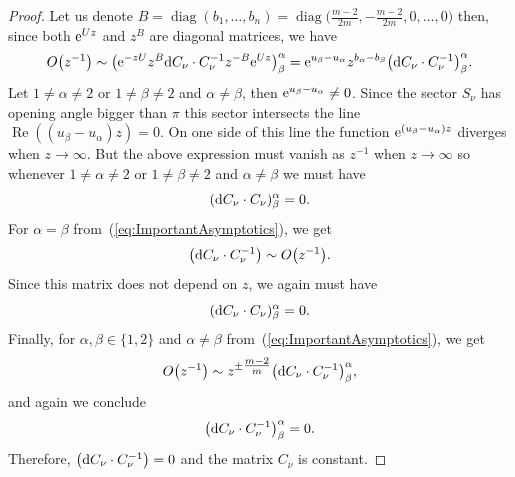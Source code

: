 \documentclass[10pt,a4paper]{amsart}
\numberwithin{equation}{section}
\begin{document}
\begin{proof}
 Let us denote $B=\operatorname{diag}(b_{1},\dots,b_{n})=\operatorname{diag}\bigl(\tfrac{m-2}{2m},-\tfrac{m-2}{2m},0,\dots,0\bigr)$ then, since both ${\rm e}^{Uz}$ and $z^{B}$ are diagonal matrices, we have
 \begin{equation}
 \label{eq:ImportantAsymptotics}
 O\bigl(z^{-1}\bigr)\sim\bigl({\rm e}^{-zU}z^{B}{\rm d} C_{\nu}\cdot C_{\nu}^{-1}z^{-B}{\rm e}^{Uz}\bigr)^{\alpha}_{\beta}={\rm e}^{u_{\beta}-u_{\alpha}}z^{b_{\alpha}-b_{\beta}}\bigl({\rm d}C_{\nu}\cdot C_{\nu}^{-1}\bigr)^{\alpha}_{\beta}.
 \end{equation}
 Let $1\neq\alpha\neq 2$ or $1\neq\beta\neq 2$ and $\alpha\neq\beta$, then ${\rm e}^{u_{\beta}-u_{\alpha}}\neq 0$. Since the sector $S_{\nu}$ has opening angle bigger than $\pi$ this sector intersects the line $\operatorname{Re}((u_{\beta}-u_{\alpha})z)=0$. On one side of this line the function ${\rm e}^{(u_{\beta}-u_{\alpha})z}$ diverges when $z\rightarrow\infty$. But the above expression must vanish as $z^{-1}$ when $z\rightarrow\infty$ so whenever $1\neq\alpha\neq 2$ or $1\neq\beta\neq 2$ and $\alpha\neq\beta$ we must have
 \begin{equation*}
 ({\rm d}C_{\nu}\cdot C_{\nu})^{\alpha}_{\beta}=0.
 \end{equation*}
 For $\alpha=\beta$ from~(\ref{eq:ImportantAsymptotics}), we get
 \begin{equation*}
 \bigl({\rm d}C_{\nu}\cdot C_{\nu}^{-1}\bigr)\sim O\bigl(z^{-1}\bigr).
 \end{equation*}
 Since this matrix does not depend on $z$, we again must have
 \begin{equation*}
 ({\rm d}C_{\nu}\cdot C_{\nu})^{\alpha}_{\beta}=0.
 \end{equation*}
 Finally, for $\alpha,\beta\in\{ 1,2 \}$ and $\alpha\neq\beta$ from~(\ref{eq:ImportantAsymptotics}), we get
 \begin{equation*}
 O\bigl(z^{-1}\bigr)\sim z^{\pm\tfrac{m-2}{m}}\bigl({\rm d}C_{\nu}\cdot C_{\nu}^{-1}\bigr)^{\alpha}_{\beta},
 \end{equation*}
 and again we conclude
 \begin{equation*}
 \bigl({\rm d}C_{\nu}\cdot C_{\nu}^{-1}\bigr)^{\alpha}_{\beta}=0.
 \end{equation*}
 Therefore, $\bigl({\rm d}C_{\nu}\cdot C_{\nu}^{-1}\bigr)=0$ and the matrix $C_{\nu}$ is constant.
\end{proof}
\end{document}
